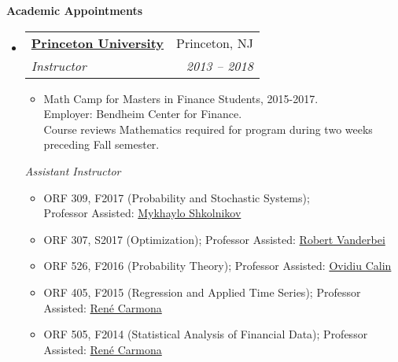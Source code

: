 \documentclass[letterpaper,11pt]{article}
\makeatletter
\newcommand{\resitem}[1]{\item #1 \vspace{-2pt}}
\newcommand{\resheading}[1]{{\large {\textbf{#1 \vphantom{p\^{E}}}}}}
\newenvironment{widetable}[1]
	       {\begin{tabular*}{#1}[t]{l@{\extracolsep{\fill}}r}}
	       {\end{tabular*}}
\newcommand{\ressubheading}[4]{
  \begin{widetable}{\textwidth - 28pt}
		\textbf{#1} & #2 \\
		\textit{#3} & \textit{#4} \\
  \end{widetable}
  \vspace{-12pt}}
\makeatother
\begin{document}
\pagebreak

\resheading{Academic Appointments}

\begin{itemize}
\item
  \ressubheading{\href{https://orfe.princeton.edu/courses}{Princeton University}}
		{Princeton, NJ}
		{Instructor}
		{2013 -- 2018}
		\begin{itemize}
			\item Math Camp for Masters in Finance Students, 2015-2017. \\
			Employer: Bendheim Center for Finance. \\
			Course reviews Mathematics required for program during two weeks preceding Fall semester.
		\end{itemize}
		{\emph{Assistant Instructor}}
              	\begin{itemize}
                    \resitem{ORF 309, F2017 (Probability and Stochastic Systems); \\ Professor Assisted: \href{http://www.princeton.edu/~mykhaylo/}{Mykhaylo Shkolnikov}}
                    \resitem{ORF 307, S2017 (Optimization); Professor Assisted: \href{http://www.princeton.edu/~rvdb/}{Robert Vanderbei}}
                    \resitem{ORF 526, F2016 (Probability Theory); Professor Assisted: \href{https://people.emich.edu/ocalin/Home.htm}{Ovidiu Calin}}
                    \resitem{ORF 405, F2015 (Regression and Applied Time Series); Professor Assisted: \href{https://www.princeton.edu/~rcarmona/}{Ren\'{e} Carmona}}
                    \resitem{ORF 505, F2014 (Statistical Analysis of Financial Data); Professor Assisted: \href{https://www.princeton.edu/~rcarmona/}{Ren\'{e} Carmona}}
               	\end{itemize}


\end{itemize}
\end{document}
